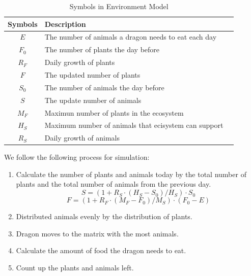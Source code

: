 \documentclass{mcmthesis}
\begin{document}
\begin{table}[!htbp]
\centering
\caption{Symbols in Environment Model}
\begin{tabular}{cll}
\toprule
\textbf{Symbols}   & \textbf{Description}                                   \\
\midrule
$E$                & The number of animals a dragon needs to eat each day   \\
$F_{0}$            & The number of plants the day before                    \\
$R_{F}$            & Daily growth of plants                                 \\
$F$                & The updated number of plants                           \\
$S_{0}$            & The number of animals the day before                   \\
$S$                & The update number of animals                           \\
$M_{F}$            & Maximun number of plants in the ecosystem              \\
$H_{S}$            & Maximum number of animals that ecisystem can support   \\
$R_{S}$            & Daily growth of animals                                \\
\bottomrule
\end{tabular}\label{tb:Variables4}
\end{table}

We follow the following process for simulation:
\begin{enumerate}
    \item Calculate the number of plants and animals today by the total number of plants and the total number of animals from the previous day.
    \begin{equation}
        S=(1+R_{S}\cdot (H_{S}-S_{0})/H_{S})\cdot S_{0}
    \end{equation}
    \begin{equation}
        F=(1+R_{F}\cdot (M_{F}-F_{0})/M_{S})\cdot (F_{0}-E)
    \end{equation}
    \item Distributed animals evenly by the distribution of plants.
    \item Dragon moves to the matrix with the most animals.
    \item Calculate the amount of food the dragon needs to eat.
    \item Count up the plants and animals left.
\end{enumerate}
\end{document}

